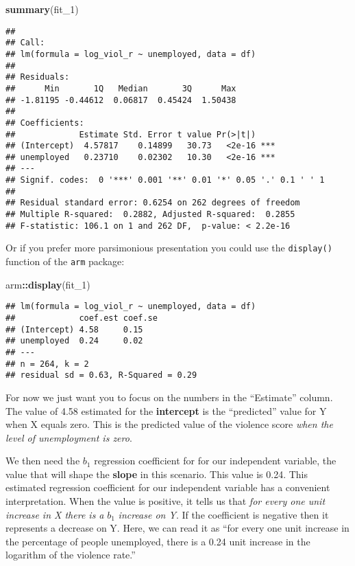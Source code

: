 \documentclass[
]{book}
\newenvironment{Shaded}{\begin{snugshade}}{\end{snugshade}}
\newcommand{\FunctionTok}[1]{\textcolor[rgb]{0.13,0.29,0.53}{\textbf{#1}}}
\newcommand{\NormalTok}[1]{#1}
\newcommand{\SpecialCharTok}[1]{\textcolor[rgb]{0.81,0.36,0.00}{\textbf{#1}}}
\begin{document}
\begin{Shaded}
\begin{Highlighting}[]
\FunctionTok{summary}\NormalTok{(fit\_1)}
\end{Highlighting}
\end{Shaded}

\begin{verbatim}
## 
## Call:
## lm(formula = log_viol_r ~ unemployed, data = df)
## 
## Residuals:
##      Min       1Q   Median       3Q      Max 
## -1.81195 -0.44612  0.06817  0.45424  1.50438 
## 
## Coefficients:
##             Estimate Std. Error t value Pr(>|t|)    
## (Intercept)  4.57817    0.14899   30.73   <2e-16 ***
## unemployed   0.23710    0.02302   10.30   <2e-16 ***
## ---
## Signif. codes:  0 '***' 0.001 '**' 0.01 '*' 0.05 '.' 0.1 ' ' 1
## 
## Residual standard error: 0.6254 on 262 degrees of freedom
## Multiple R-squared:  0.2882, Adjusted R-squared:  0.2855 
## F-statistic: 106.1 on 1 and 262 DF,  p-value: < 2.2e-16
\end{verbatim}

Or if you prefer more parsimonious presentation you could use the \texttt{display()} function of the \texttt{arm} package:

\begin{Shaded}
\begin{Highlighting}[]
\NormalTok{arm}\SpecialCharTok{::}\FunctionTok{display}\NormalTok{(fit\_1)}
\end{Highlighting}
\end{Shaded}

\begin{verbatim}
## lm(formula = log_viol_r ~ unemployed, data = df)
##             coef.est coef.se
## (Intercept) 4.58     0.15   
## unemployed  0.24     0.02   
## ---
## n = 264, k = 2
## residual sd = 0.63, R-Squared = 0.29
\end{verbatim}

For now we just want you to focus on the numbers in the ``Estimate'' column. The value of 4.58 estimated for the \textbf{intercept} is the ``predicted'' value for Y when X equals zero. This is the predicted value of the violence score \emph{when the level of unemployment is zero}.

We then need the \(b_1\) regression coefficient for for our independent variable, the value that will shape the \textbf{slope} in this scenario. This value is 0.24. This estimated regression coefficient for our independent variable has a convenient interpretation. When the value is positive, it tells us that \emph{for every one unit increase in X there is a} \(b_1\) \emph{increase on Y}. If the coefficient is negative then it represents a decrease on Y. Here, we can read it as ``for every one unit increase in the percentage of people unemployed, there is a 0.24 unit increase in the logarithm of the violence rate.''
\end{document}
